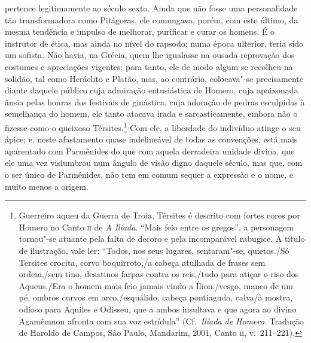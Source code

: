 pertence legitimamente ao século sexto. Ainda que não fosse uma personalidade
tão transformadora como Pitágoras, ele comungava, porém, com este último, da
mesma tendência e impulso de melhorar, purificar e curar os homens. É o
instrutor de ética, mas ainda no nível do rapsodo; numa época ulterior, teria
sido um sofista. Não havia, na Grécia, quem lhe igualasse na ousada
reprovação dos costumes e apreciações vigentes; para tanto, ele de modo algum
se recolheu na solidão, tal como Heráclito e Platão, mas, ao contrário,
colocava"-se precisamente diante daquele público cuja admiração entusiástica
de Homero, cuja apaixonada ânsia pelas honras dos festivais de ginástica,
cuja adoração de pedras esculpidas à semelhança do homem, ele tanto atacava
irada e sarcasticamente, embora não o fizesse como o queixoso
Térsites.\footnote{ Guerreiro aqueu da Guerra de Troia, Térsites é descrito
com fortes cores por Homero no Canto \textsc{ii} de \textit{A Ilíada}. ``Mais
feio entre os gregos'', a personagem tornou"-se atuante pela falta de decoro
e pela incomparável rabugice. A título de ilustração, vale ler: ``Todos, nos
seus lugares, sentaram"-se, quietos./Só Tersites crocita, corvo boquirroto,/a
cabeça atulhada de frases sem ordem,/sem tino, desatinos farpas contra os
reis,/tudo para atiçar o riso dos Aqueus./Era o homem mais feio jamais vindo
a Ílion:/vesgo, manco de um pé, ombros curvos em arco,/esquálido, cabeça
pontiaguda, calva/à mostra, odioso para Aquiles e Odisseu, que a ambos
insultava e que agora ao divino Agamêmnon afronta com sua voz estrídula''
(Cf.~\textit{Ilíada de Homero}. Tradução de Haroldo de Campos, São Paulo,
Mandarim, 2001, Canto \textsc{ii}, v.~211--221).} Com ele, a liberdade do
indivíduo atinge o seu ápice; e, neste afastamento quase indelineável de
todas as convenções, está mais aparentado com Parmênides do que com aquela
derradeira unidade divina, que ele uma vez vislumbrou num ângulo de visão
digno daquele século, mas que, com o ser único de Parmênides, não tem em
comum sequer a expressão e o nome, e muito menos a origem.

